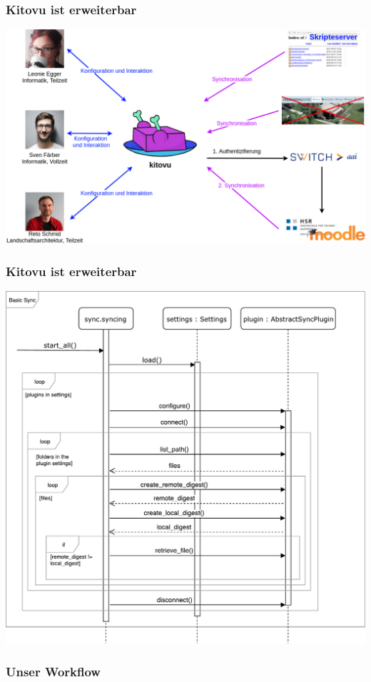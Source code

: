 \documentclass{beamer}
\begin{document}
	\begin{frame}
	\frametitle{Kitovu ist erweiterbar}
	\includegraphics[width=\linewidth]{../03_End_of_Elaboration/img/kontextdiagramm.png}
	\end{frame}
	
	\begin{frame}
	\frametitle{Kitovu ist erweiterbar}
	\includegraphics[height=0.9\textheight]{../03_End_of_Elaboration/img/GrobesSequenzDiagramm.pdf}
	\end{frame}
	
	\begin{frame}
	\frametitle{Unser Workflow}
	\end{frame}
	
\end{document}
